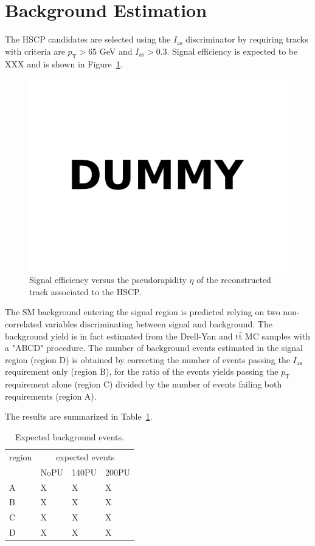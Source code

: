 \documentclass[11pt,oneside,a4paper]{article}
\begin{document}
\section{Background Estimation}

The HSCP candidates are selected using the $I_{\mathrm{as}}$ discriminator by requiring tracks with  criteria are $p_{\mathrm{T}} > 65$ GeV and $I_{\mathrm{as}} > 0.3$. 
Signal efficiency is expected to be XXX and is shown in Figure~\ref{fig:effeta}.


\begin{figure}
\centering
\includegraphics[width=.5\textwidth]{figures/dummy.pdf}
\caption{Signal efficiency versus the pseudorapidity $\eta$ of the reconstructed track associated to the HSCP.\label{fig:effeta}}
\end{figure}


The SM background entering the signal region is predicted relying on two non-correlated variables discriminating between signal and background.
The background yield is in fact estimated from the Drell-Yan and $\mathrm{t}\bar{\mathrm{t}}$ MC samples with a "ABCD" procedure.
The number of background events estimated in the signal region (region D) is obtained by correcting the number of events passing the $I_{\mathrm{as}}$ requirement only (region B), for the ratio of the events yields passing the $p_{\mathrm{T}}$ requirement alone (region C) divided by the number of events failing both requirements (region A).


The results are summarized in Table~\ref{tab:numbers}.


\begin{table}
 \centering
 \caption{Expected background events.\label{tab:numbers}}
 \begin{tabular}{llll}
  \toprule
  region 	& \multicolumn{3}{c}{expected events} \\
		& NoPU	& 140PU	& 200PU \\
  \midrule
  A		& X 	& X	& X	\\
  B		& X 	& X	& X	\\
  C		& X 	& X	& X	\\
  \midrule
  D		& X 	& X	& X	\\
  \bottomrule
 \end{tabular}
\end{table}
\end{document}
